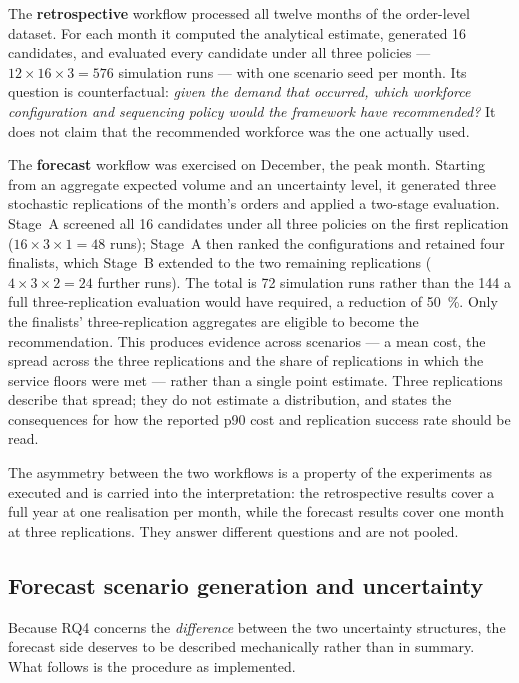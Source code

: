 The \textbf{retrospective} workflow processed all twelve months of the order-level dataset. For
each month it computed the analytical estimate, generated 16 candidates, and evaluated every
candidate under all three policies --- \(12 \times 16 \times 3 = 576\) simulation runs --- with
one scenario seed per month. Its question is counterfactual: \emph{given the demand that
occurred, which workforce configuration and sequencing policy would the framework have
recommended?} It does not claim that the recommended workforce was the one actually used.

The \textbf{forecast} workflow was exercised on December, the peak month. Starting from an
aggregate expected volume and an uncertainty level, it generated three stochastic replications
of the month's orders and applied a two-stage evaluation. Stage~A screened all 16 candidates
under all three policies on the first replication (\(16 \times 3 \times 1 = 48\) runs); Stage~A
then ranked the configurations and retained four finalists, which Stage~B extended to the two
remaining replications (\(4 \times 3 \times 2 = 24\) further runs). The total is 72 simulation
runs rather than the 144 a full three-replication evaluation would have required, a reduction
of \SI{50}{\percent}. Only the finalists' three-replication aggregates are eligible to become
the recommendation. This produces evidence across scenarios --- a mean cost, the spread across
the three replications and the share of replications in which the service floors were met ---
rather than a single point estimate. Three replications describe that spread; they do not
estimate a distribution, and  states the consequences for how the reported
p90 cost and replication success rate should be read.

The asymmetry between the two workflows is a property of the experiments as executed and is
carried into the interpretation: the retrospective results cover a full year at one realisation
per month, while the forecast results cover one month at three replications. They answer
different questions and are not pooled.

\subsection{Forecast scenario generation and uncertainty}
\label{sec:future-uncertainty}

Because RQ4 concerns the \emph{difference} between the two uncertainty structures, the forecast
side deserves to be described mechanically rather than in summary. What follows is the
procedure as implemented.

